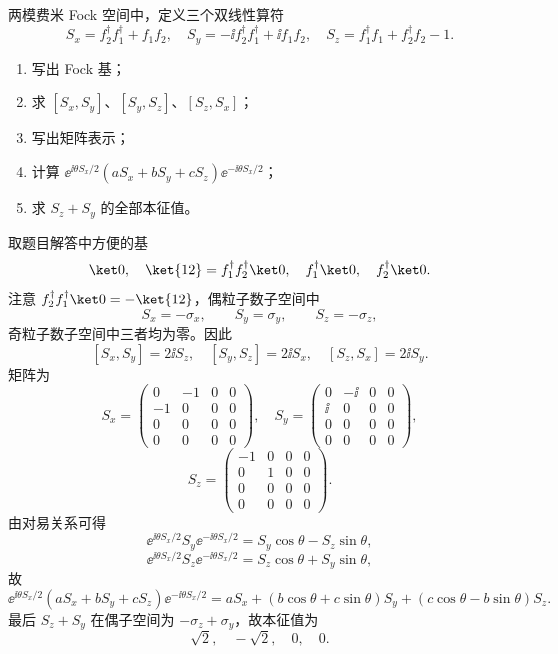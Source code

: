 \begin{question}
两模费米 Fock 空间中，定义三个双线性算符
\[
  S_x=f_2^\dagger f_1^\dagger+f_1f_2,
  \quad S_y=-\ii f_2^\dagger f_1^\dagger+\ii f_1f_2,
  \quad S_z=f_1^\dagger f_1+f_2^\dagger f_2-1.
\]
\begin{enumerate}
  \item 写出 Fock 基；
  \item 求 $[S_x,S_y]$、$[S_y,S_z]$、$[S_z,S_x]$；
  \item 写出矩阵表示；
  \item 计算 $\ee^{\ii\theta S_x/2}(aS_x+bS_y+cS_z)\ee^{-\ii\theta S_x/2}$；
  \item 求 $S_z+S_y$ 的全部本征值。
\end{enumerate}
\begin{solution}
取题目解答中方便的基
\[
  \ket0,
  \quad \ket{12}=f_1^\dagger f_2^\dagger\ket0,
  \quad f_1^\dagger\ket0,
  \quad f_2^\dagger\ket0.
\]
注意 $f_2^\dagger f_1^\dagger\ket0=-\ket{12}$，偶粒子数子空间中
\[
  S_x=-\sigma_x,
  \qquad S_y=\sigma_y,
  \qquad S_z=-\sigma_z,
\]
奇粒子数子空间中三者均为零。因此
\[
  [S_x,S_y]=2\ii S_z,
  \quad [S_y,S_z]=2\ii S_x,
  \quad [S_z,S_x]=2\ii S_y.
\]
矩阵为
\[
S_x=\begin{pmatrix}0&-1&0&0\\-1&0&0&0\\0&0&0&0\\0&0&0&0\end{pmatrix},\quad
S_y=\begin{pmatrix}0&-\ii&0&0\\\ii&0&0&0\\0&0&0&0\\0&0&0&0\end{pmatrix},
\]
\[
S_z=\begin{pmatrix}-1&0&0&0\\0&1&0&0\\0&0&0&0\\0&0&0&0\end{pmatrix}.
\]
由对易关系可得
\[
  \ee^{\ii\theta S_x/2}S_y\ee^{-\ii\theta S_x/2}=S_y\cos\theta-S_z\sin\theta,
\]
\[
  \ee^{\ii\theta S_x/2}S_z\ee^{-\ii\theta S_x/2}=S_z\cos\theta+S_y\sin\theta,
\]
故
\[
\ee^{\ii\theta S_x/2}(aS_x+bS_y+cS_z)\ee^{-\ii\theta S_x/2}
=aS_x+(b\cos\theta+c\sin\theta)S_y+(c\cos\theta-b\sin\theta)S_z.
\]
最后 $S_z+S_y$ 在偶子空间为 $-\sigma_z+\sigma_y$，故本征值为
\[
  \sqrt2,
  \quad -\sqrt2,
  \quad 0,
  \quad 0.
\]
\end{solution}
\end{question}

